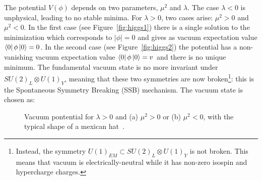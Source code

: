 The potential $V(\phi)$ depends on two parameters, $\mu^2$ and $\lambda$. 
The case $\lambda<0$ is unphysical, leading to no stable minima. For 
$\lambda>0$, two cases arise: $\mu^2>0$ and $\mu^2<0$. In the first case
(see Figure~\ref{fig:higgs1}) there is a single solution to the minimization
which corresponds to $|\phi|=0$ and gives as vacuum expectation value
$\bra{0}\phi \ket{0} = 0$. In the second case (see Figure~\ref{fig:higgs2}) 
the potential has a non-vanishing vacuum expectation value 
$\bra{0}\phi \ket{0} = v$ and %
there is no unique minimum. The fundamental vacuum 
state is no more invariant under $SU(2)_{L} \otimes U(1)_{Y}$, 
meaning that these two symmetries are now 
broken\footnote{Instead, the symmetry $U(1)_{EM} \subset SU(2)_{L} \otimes U(1)_{Y}$ 
is not broken. This means that vacuum is electrically-neutral while 
it has non-zero isospin and hypercharge charges.}: 
this is the Spontaneous Symmetry Breaking (SSB) mechanism. 
The vacuum state is chosen as:
\begin{figure}[h!tb]\begin{center}
	\caption{Vacuum pontential for $\lambda>0$ and (a) $\mu^2>0$ or
          (b) $\mu^2<0$, with the typical shape of a mexican hat~\cite{Michael:1569839}.}
\end{center}\end{figure}


